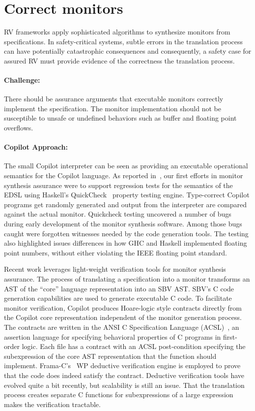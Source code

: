\section{Correct monitors} \label{sec:codecorrect} 
 RV frameworks apply sophisticated algorithms to synthesize  monitors
 from specifications. In safety-critical systems, subtle errors in the
 translation process can have potentially catastrophic
 consequences and consequently, a safety case for assured RV must
 provide evidence of the correctness the translation process.



\paragraph{Challenge:} There should be assurance arguments that
executable monitors correctly implement the specification.  The monitor implementation
should not be susceptible to unsafe or undefined behaviors such as
buffer and floating point overflows. 

\paragraph{Copilot Approach:}    
The  small  Copilot interpreter can be seen as providing an executable
operational semantics for the Copilot language.  As reported
in~\cite{pike-icfp-12}, our first efforts in monitor
synthesis assurance were  to support  regression tests for the semantics
of the EDSL using Haskell's QuickCheck~\cite{qc} property testing
engine. Type-correct Copilot programs get randomly generated and
output from the interpreter are compared against the actual
monitor. Quickcheck testing uncovered 
a number of bugs during early development of the monitor synthesis
software. Among those bugs caught were forgotten witnesses needed by
the code generation tools. The testing also highlighted issues
differences in how GHC and Haskell implemented floating point numbers,
without either violating the IEEE floating point standard. 


Recent work  leverages light-weight verification tools for monitor
synthesis assurance.   The process of translating a specification into a monitor
transforms an AST of the ``core'' language representation into an SBV
AST.  SBV's C code generation capabilities are used to generate 
executable C code.  To facilitate monitor verification, Copilot 
produces Hoare-logic style contracts directly from the Copilot core
representation independent of the monitor generation process. The
contracts are written in the ANSI C Specification Language
(ACSL)~\cite{baudin09acsl}, an assertion language for specifying
behavioral properties of C programs in first-order logic.  Each file has a contract  with an ACSL 
post-condition  specifying the subexpression of the core
AST representation that the function should  implement. 
Frama-C's~\cite{framac} WP deductive verification engine is employed
to prove that the code does indeed satisfy the contract. Deductive
verification tools have evolved quite a bit recently, but scalability
is still an issue.  That the translation process creates separate C
functions for subexpressions of a large expression makes the
verification tractable. 


